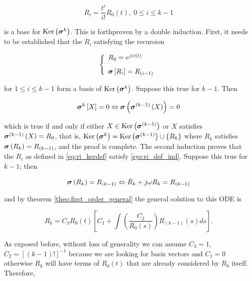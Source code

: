 \begin{equation} R_i = \dfrac{t^{i}}{i!} R_0(t),\ 0\leq i \leq k - 1 \label{eq:ri_kerdef}\end{equation}

	\noindent is a base for $\operatorname{Ker}\left(\boldsymbol{\sigma}^{k}\right)$. This is forthproven by a double induction. First, it needs to be established that the $R_i$ satisfying the recursion

\begin{equation}\left\{\begin{array}{l} R_0 = e^{j\psi(t)} \\[3mm] \boldsymbol{\sigma}\left[R_i\right] = R_{(i-1)}\end{array}\right. \label{sys:ri_def_ind}\end{equation}

	\noindent for $1\leq i \leq k - 1$ form a basis of $\operatorname{Ker}\left(\boldsymbol{\sigma}^{k}\right)$. Suppose this true for $k-1$. Then

\begin{equation} \boldsymbol{\sigma}^{k}\left[X\right] = 0 \Leftrightarrow  \boldsymbol{\sigma}\left(\boldsymbol{\sigma}^{(k-1)}\left(X\right)\right) = 0 \end{equation}

	which is true if and only if either $X\in\operatorname{Ker}\left(\boldsymbol{\sigma}^{\left(k-1\right)}\right)$ or $X$ satisfies $\boldsymbol{\sigma}^{(k-1)}\left(X\right) = R_0$, that is, $\operatorname{Ker}\left(\boldsymbol{\sigma}^{k}\right) = \operatorname{Ker}\left(\boldsymbol{\sigma}^{(k-1)}\right)\cup \left\{R_{k}\right\}$ where $R_{k}$ satisfies $\boldsymbol{\sigma}\left(R_{k}\right) = R_{(k-1)}$, and the proof is complete. The second induction proves that the $R_i$ as defined in \eqref{eq:ri_kerdef} satisfy \eqref{sys:ri_def_ind}. Suppose this true for $k-1$; then 

\begin{equation} \boldsymbol{\sigma}\left(R_{k}\right) = R_{(k-1)} \Leftrightarrow \dot{R}_{k} + j\omega R_{k} = R_{(k-1)} \end{equation}

	\noindent and by theorem \ref{theo:first_order_general} the general solution to this ODE is

\begin{equation} R_{k} = C_3R_0(t) \left[C_1 + \int \left(\dfrac{C_2}{R_0(s)}\right) R_{(k-1)}(s)ds\right] .\end{equation}

	As exposed before, without loss of generality we can assume $C_3 = 1$, $C_2 = \left[\left(k-1\right)!\right]^{-1}$ because we are looking for basis vectors and $C_1 = 0$ otherwise $R_k$ will have terms of $R_0(t)$ that are already considered by $R_{0}$ itself. Therefore,

